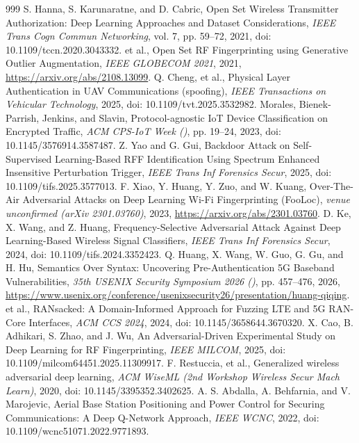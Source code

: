 \documentclass[10.5pt,compsoc,winfonts]{ICN}
\begin{document}
\begin{thebibliography}{999}
S. Hanna, S. Karunaratne, and D. Cabric, Open Set Wireless Transmitter Authorization: Deep Learning Approaches and Dataset Considerations, \emph{IEEE Trans Cogn Commun Networking}, vol. 7, pp. 59–72, 2021, doi: 10.1109/tccn.2020.3043332.
et al., Open Set RF Fingerprinting using Generative Outlier Augmentation, \emph{IEEE GLOBECOM 2021}, 2021, \url{https://arxiv.org/abs/2108.13099}.
Q. Cheng, et al., Physical Layer Authentication in UAV Communications (spoofing), \emph{IEEE Transactions on Vehicular Technology}, 2025, doi: 10.1109/tvt.2025.3532982.
Morales, Bienek-Parrish, Jenkins, and Slavin, Protocol-agnostic IoT Device Classification on Encrypted Traffic, \emph{ACM CPS-IoT Week ()}, pp. 19–24, 2023, doi: 10.1145/3576914.3587487.
Z. Yao and G. Gui, Backdoor Attack on Self-Supervised Learning-Based RFF Identification Using Spectrum Enhanced Insensitive Perturbation Trigger, \emph{IEEE Trans Inf Forensics Secur}, 2025, doi: 10.1109/tifs.2025.3577013.
F. Xiao, Y. Huang, Y. Zuo, and W. Kuang, Over-The-Air Adversarial Attacks on Deep Learning Wi-Fi Fingerprinting (FooLoc), \emph{venue unconfirmed (arXiv 2301.03760)}, 2023, \url{https://arxiv.org/abs/2301.03760}.
D. Ke, X. Wang, and Z. Huang, Frequency-Selective Adversarial Attack Against Deep Learning-Based Wireless Signal Classifiers, \emph{IEEE Trans Inf Forensics Secur}, 2024, doi: 10.1109/tifs.2024.3352423.
Q. Huang, X. Wang, W. Guo, G. Gu, and H. Hu, Semantics Over Syntax: Uncovering Pre-Authentication 5G Baseband Vulnerabilities, \emph{35th USENIX Security Symposium 2026 ()}, pp. 457–476, 2026, \url{https://www.usenix.org/conference/usenixsecurity26/presentation/huang-qiqing}.
et al., RANsacked: A Domain-Informed Approach for Fuzzing LTE and 5G RAN-Core Interfaces, \emph{ACM CCS 2024}, 2024, doi: 10.1145/3658644.3670320.
X. Cao, B. Adhikari, S. Zhao, and J. Wu, An Adversarial-Driven Experimental Study on Deep Learning for RF Fingerprinting, \emph{IEEE MILCOM}, 2025, doi: 10.1109/milcom64451.2025.11309917.
F. Restuccia, et al., Generalized wireless adversarial deep learning, \emph{ACM WiseML (2nd Workshop Wireless Secur Mach Learn)}, 2020, doi: 10.1145/3395352.3402625.
A. S. Abdalla, A. Behfarnia, and V. Marojevic, Aerial Base Station Positioning and Power Control for Securing Communications: A Deep Q-Network Approach, \emph{IEEE WCNC}, 2022, doi: 10.1109/wcnc51071.2022.9771893.

\end{thebibliography}
\end{document}
